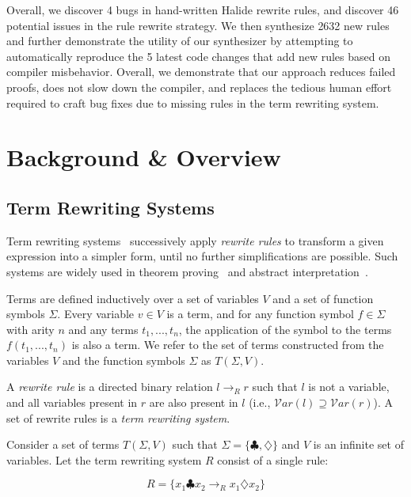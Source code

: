 \documentclass[sigplan,10pt,review,anonymous]{acmart}\settopmatter{printfolios=true,printccs=false,printacmref=false}
\newcommand{\NumRulesFixed}{{\color{black} 4}\xspace}
\newcommand{\NumOrderingProblems}{{\color{black} 46}\xspace}
\newcommand{\NumRulesSynthesized}{{\color{black} 2632}\xspace}
\newcommand{\NumBugsAutomated}{{\color{black} 5}\xspace}
\begin{document}
Overall, we discover \NumRulesFixed bugs in hand-written Halide rewrite rules, and discover \NumOrderingProblems
potential issues in the rule rewrite strategy.  We then synthesize \NumRulesSynthesized new rules 
and further demonstrate the utility of our synthesizer by attempting to
automatically reproduce the \NumBugsAutomated latest code changes that add new
rules based on compiler misbehavior.
Overall, we demonstrate that our approach
reduces failed proofs,  does not slow down the compiler, and replaces the
tedious human effort required to craft bug fixes due to missing rules in the
term rewriting system.

\section{Background \& Overview}
\subsection{Term Rewriting Systems}
Term rewriting systems~\cite{gorn1967} successively apply \textit{rewrite rules} to transform a given
expression into a simpler form, until no further simplifications are possible.  Such systems are widely
used in theorem proving~\cite{baader1999term} and abstract interpretation~\cite{cousot1977abstract, cousot1979systematic}.

Terms are defined inductively over a set of variables $V$ and a set of function symbols $\Sigma$. Every variable $v \in V$ is a term, and for any function symbol $f \in \Sigma$ with arity $n$ and any terms $t_1, ..., t_n$, the application of the symbol to the terms $f(t_1, ..., t_n)$ is also a term. We refer to the set of terms constructed from the variables $V$ and the function symbols $\Sigma$ as $T(\Sigma, V)$.

A \emph{rewrite rule} is a directed binary relation $l \rightarrow_R r$ such that $l$ is not a variable, and all variables present in $r$ are also present in $l$ (i.e., $\mathcal{V}ar(l) \supseteq \mathcal{V}ar(r)$). A set of rewrite rules is a \emph{term rewriting system}.

Consider a set of terms $T(\Sigma, V)$ such that $\Sigma = \{\clubsuit, \diamondsuit\}$ and $V$ is an infinite set of variables. Let the term rewriting system $R$ consist of a single rule:

\[ R = \{ x_1 \clubsuit x_2 \rightarrow_R x_1 \diamondsuit x_2 \} \]
\end{document}
